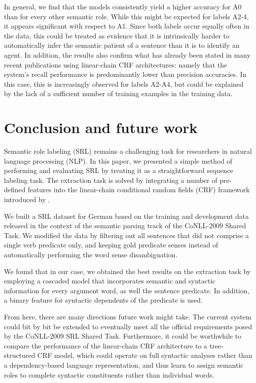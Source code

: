 \documentclass[a4paper,twoside,12pt]{article}
\begin{document}
In general, we find that the models consistently yield a higher accuracy for A0 than for every other semantic role. While this might be expected for labels A2-4, it appears significant with respect to A1. Since both labels occur equally often in the data, this could be treated as evidence that it is intrinsically harder to automatically infer the semantic patient of a sentence than it is to identify an agent. In addition, the results also confirm what has already been stated in many recent publications using linear-chain CRF architectures: namely that the system's recall performance is predominantly lower than precision accuracies. In this case, this is increasingly observed for labels A2-A4, but could be explained by the lack of a sufficient number of training examples in the training data. 

\section{Conclusion and future work}
\label{sec:end}

Semantic role labeling (SRL) remains a challenging task for researchers in natural language processing (NLP). In this paper, we presented a simple method of performing and evaluating SRL by treating it as a straightforward sequence labeling task. The extraction task is solved by integrating a number of pre-defined features into the linear-chain conditional random fields (CRF) framework introduced by \cite{lafferty}.

We built a SRL dataset for German based on the training and development data released in the context of the semantic parsing track of the CoNLL-2009 Shared Task. We modified the data by filtering out all sentences that did not comprise a single verb predicate only, and keeping gold predicate senses instead of automatically performing the word sense disambiguation.

We found that in our case, we obtained the best results on the extraction task by employing a cascaded model that incorporates semantic and syntactic information for every argument word, as well the sentence predicate. In addition, a binary feature for syntactic dependents of the predicate is used.

From here, there are many directions future work might take. The current system could bit by bit be extended to eventually meet all the official requirements posed by the CoNLL-2009 SRL Shared Task. Furthermore, it could be worthwhile to compare the performance of the linear-chain CRF architecture to a tree-structured CRF model, which could operate on full syntactic analyses rather than a dependency-based language representation, and thus learn to assign semantic roles to complete syntactic constituents rather than individual words.



\end{document}
